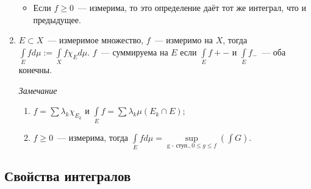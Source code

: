 \documentclass{article}
\begin{document}
\begin{enumerate}
\begin{itemize}
                    \item Если $f \geqslant 0$~--- измерима, то это определение даёт тот же интеграл, что и предыдущее.
                
                \end{itemize}
            
            \item $E \subset X$~--- измеримое множество, $f$~--- измеримо на $X$, тогда $\int\limits_{E} f d \mu := \int\limits_{X} f \chi_E d \mu$. $f$~--- суммируема на $E$ если $\int\limits_{E} f+-$ и $\int\limits_{E} f_-$~--- оба конечны.
            
                \textit{Замечание} 
                
                    \begin{enumerate}
                    
                        \item $f = \sum \lambda_k \chi_{E_k}$ и $\int\limits_{E} f = \sum \lambda_k \mu \left( E_k \cap E \right)$;
                
                        \item $f \geqslant 0$~--- измерима, тогда $\int\limits_{E} f d \mu = \sup\limits_{\text{g - ступ.}, 0 \leqslant g \leqslant f} \left( \int G \right)$.
                        
                    \end{enumerate}
                    
        \end{enumerate}
        
    \subsection{Свойства интегралов}
    
\end{document}
